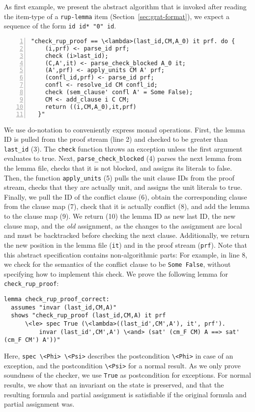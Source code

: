 \documentclass[smallcondensed]{svjour3}     %
\newcommand{\isai}{\lstinline[language=isabelle,basicstyle=\normalsize\ttfamily\slshape]}
\newcommand{\lsti}{\lstinline[language={},literate={}]}
\begin{document}
As first example, we present the abstract algorithm that is invoked after reading the item-type of a \lsti{rup-lemma} item (\cf Section~\ref{sec:grat-format}),
\ie we expect a sequence of the form \lstinline[language={},literate={}]{id id* "0" id}.
\begin{lstlisting}[numbers=left, xleftmargin=2em]
  "check_rup_proof == \<lambda>(last_id,CM,A_0) it prf. do {
    (i,prf) <- parse_id prf;
    check (i>last_id);
    (C,A',it) <- parse_check_blocked A_0 it;
    (A',prf) <- apply_units CM A' prf;
    (confl_id,prf) <- parse_id prf;
    confl <- resolve_id CM confl_id;
    check (sem_clause' confl A' = Some False);
    CM <- add_clause i C CM;
    return ((i,CM,A_0),it,prf)
  }"
\end{lstlisting}
We use do-notation to conveniently express monad operations. 
First, the lemma ID is pulled from the proof stream (line 2) and checked to be greater than \isai{last_id} (3).
The \isai$check$ function throws an exception unless the first argument evaluates to true.
Next, \isai{parse_check_blocked} (4) parses the next lemma from the lemma file, checks that it is not blocked, and assigns its literals to false.
Then, the function \isai$apply_units$ (5) pulls the unit clause IDs from the proof stream, checks that they are actually unit, and assigns the unit literals to true.
Finally, we pull the ID of the conflict clause (6), obtain the corresponding clause from the clause map (7), check that it is actually conflict (8), and add the lemma to the clause map (9).
We return (10) the lemma ID as new last ID, the new clause map, and the \emph{old} assignment, as the changes to the assignment are local and must be backtracked before checking
the next clause. Additionally, we return the new position in the lemma file (\isai$it$) and in the proof stream (\isai$prf$).
Note that this abstract specification contains non-algorithmic parts: For example, in line 8, we check for the semantics of the conflict clause to be \isai{Some False}, without
specifying how to implement this check.
%
We prove the following lemma for \isai{check_rup_proof}:
\begin{lstlisting}
lemma check_rup_proof_correct: 
  assumes "invar (last_id,CM,A)"
  shows "check_rup_proof (last_id,CM,A) it prf
      \<le> spec True (\<lambda>((last_id',CM',A'), it', prf'). 
          invar (last_id',CM',A') \<and> (sat' (cm_F CM) A ==> sat' (cm_F CM') A'))"
\end{lstlisting}
Here, \isai{spec \<Phi> \<Psi>} describes the postcondition \isai$\<Phi>$ in case of an exception, and the postcondition \isai$\<Psi>$ for a normal result.
As we only prove soundness of the checker, we use \isai$True$ as postcondition for exceptions. For normal results, 
we show that an invariant on the state is preserved, and that the resulting formula and partial assignment is satisfiable if the original formula and partial assignment was.
\end{document}
